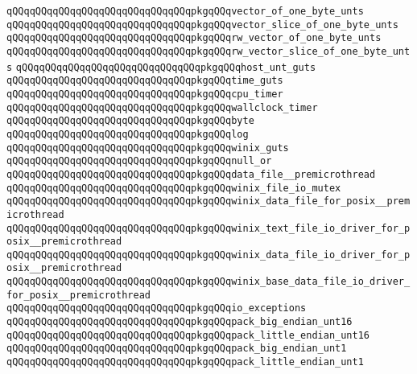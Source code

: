 \verb|qQQqqQQqqQQqqQQqqQQqqQQqqQQqqQQqpkgqQQqvector_of_one_byte_unts|\newline
\verb|qQQqqQQqqQQqqQQqqQQqqQQqqQQqqQQqpkgqQQqvector_slice_of_one_byte_unts|\newline
\verb|qQQqqQQqqQQqqQQqqQQqqQQqqQQqqQQqpkgqQQqrw_vector_of_one_byte_unts|\newline
\verb|qQQqqQQqqQQqqQQqqQQqqQQqqQQqqQQqpkgqQQqrw_vector_slice_of_one_byte_unts|\newline
\verb|qQQqqQQqqQQqqQQqqQQqqQQqqQQqqQQqpkgqQQqhost_unt_guts|\newline
\verb|qQQqqQQqqQQqqQQqqQQqqQQqqQQqqQQqpkgqQQqtime_guts|\newline
\verb|qQQqqQQqqQQqqQQqqQQqqQQqqQQqqQQqpkgqQQqcpu_timer|\newline
\verb|qQQqqQQqqQQqqQQqqQQqqQQqqQQqqQQqpkgqQQqwallclock_timer|\newline
\verb|qQQqqQQqqQQqqQQqqQQqqQQqqQQqqQQqpkgqQQqbyte|\newline
\verb|qQQqqQQqqQQqqQQqqQQqqQQqqQQqqQQqpkgqQQqlog|\newline
\verb|qQQqqQQqqQQqqQQqqQQqqQQqqQQqqQQqpkgqQQqwinix_guts|\newline
\verb|qQQqqQQqqQQqqQQqqQQqqQQqqQQqqQQqpkgqQQqnull_or|\newline
\verb|qQQqqQQqqQQqqQQqqQQqqQQqqQQqqQQqpkgqQQqdata_file__premicrothread|\newline
\verb|qQQqqQQqqQQqqQQqqQQqqQQqqQQqqQQqpkgqQQqwinix_file_io_mutex|\newline
\verb|qQQqqQQqqQQqqQQqqQQqqQQqqQQqqQQqpkgqQQqwinix_data_file_for_posix__premicrothread|\newline
\verb|qQQqqQQqqQQqqQQqqQQqqQQqqQQqqQQqpkgqQQqwinix_text_file_io_driver_for_posix__premicrothread|\newline
\verb|qQQqqQQqqQQqqQQqqQQqqQQqqQQqqQQqpkgqQQqwinix_data_file_io_driver_for_posix__premicrothread|\newline
\verb|qQQqqQQqqQQqqQQqqQQqqQQqqQQqqQQqpkgqQQqwinix_base_data_file_io_driver_for_posix__premicrothread|\newline
\verb|qQQqqQQqqQQqqQQqqQQqqQQqqQQqqQQqpkgqQQqio_exceptions|\newline
\verb|qQQqqQQqqQQqqQQqqQQqqQQqqQQqqQQqpkgqQQqpack_big_endian_unt16|\newline
\verb|qQQqqQQqqQQqqQQqqQQqqQQqqQQqqQQqpkgqQQqpack_little_endian_unt16|\newline
\verb|qQQqqQQqqQQqqQQqqQQqqQQqqQQqqQQqpkgqQQqpack_big_endian_unt1|\newline
\verb|qQQqqQQqqQQqqQQqqQQqqQQqqQQqqQQqpkgqQQqpack_little_endian_unt1|\newline

